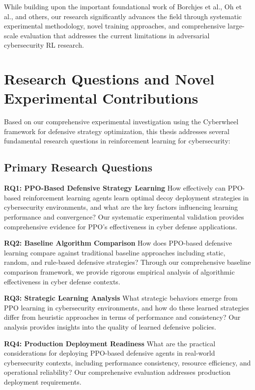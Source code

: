 \documentclass[12pt,twoside]{article}
\begin{document}
While building upon the important foundational work of Borchjes et al., Oh et al., and others, our research significantly advances the field through systematic experimental methodology, novel training approaches, and comprehensive large-scale evaluation that addresses the current limitations in adversarial cybersecurity RL research.

\section{Research Questions and Novel Experimental Contributions}

Based on our comprehensive experimental investigation using the Cyberwheel framework for defensive strategy optimization, this thesis addresses several fundamental research questions in reinforcement learning for cybersecurity:

\subsection{Primary Research Questions}

\textbf{RQ1: PPO-Based Defensive Strategy Learning} 
How effectively can PPO-based reinforcement learning agents learn optimal decoy deployment strategies in cybersecurity environments, and what are the key factors influencing learning performance and convergence? Our systematic experimental validation provides comprehensive evidence for PPO's effectiveness in cyber defense applications.

\textbf{RQ2: Baseline Algorithm Comparison}
How does PPO-based defensive learning compare against traditional baseline approaches including static, random, and rule-based defensive strategies? Through our comprehensive baseline comparison framework, we provide rigorous empirical analysis of algorithmic effectiveness in cyber defense contexts.

\textbf{RQ3: Strategic Learning Analysis}
What strategic behaviors emerge from PPO learning in cybersecurity environments, and how do these learned strategies differ from heuristic approaches in terms of performance and consistency? Our analysis provides insights into the quality of learned defensive policies.

\textbf{RQ4: Production Deployment Readiness}
What are the practical considerations for deploying PPO-based defensive agents in real-world cybersecurity contexts, including performance consistency, resource efficiency, and operational reliability? Our comprehensive evaluation addresses production deployment requirements.
\end{document}
